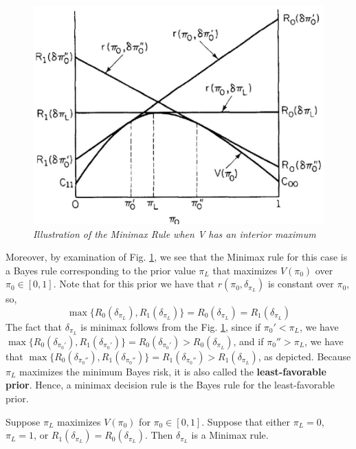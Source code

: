 \documentclass[a4paper,english,12pt]{article}
\begin{document}
\begin{figure}[h]
	\centering
	\includegraphics[width=0.7\linewidth]{Figures/minimax2}
	\caption{\textit{Illustration of the Minimax Rule when V has an interior maximum}}
	\label{fig:minimax2}
\end{figure}
\par Moreover, by examination of Fig. \ref{fig:minimax2}, we see that the Minimax rule for this case is a Bayes rule corresponding to the prior value $\pi_L$ that maximizes $V(\pi_0)$ over $\pi_0 \in [0,1]$. Note that for this prior we have that $r(\pi_0,\delta_{\pi_L})$ is constant over $\pi_0$, so,
\begin{equation}
\max\{ {R_0}({\delta _{{\pi _L}}}),{R_1}({\delta _{{\pi _L}}})\}  = {R_0}({\delta _{{\pi _L}}}) = {R_1}({\delta _{{\pi _L}}})
\end{equation}  
The fact that $\delta_{\pi_L}$ is minimax follows from the Fig. \ref{fig:minimax2}, since if $\pi_0' < \pi_L$, we have $\max\{ {R_0}({\delta _{\pi_0'}}),{R_1}({\delta _{\pi_0'}})\}  = {R_0}({\delta _{{\pi _0'}}})>{R_0}({\delta _{{\pi _L}}})$, and if $\pi_0'' > \pi_L$, we have that
$\max\{ {R_0}({\delta _{\pi_0''}}),{R_1}({\delta _{\pi_0''}})\}  = {R_1}({\delta _{{\pi _0''}}})>{R_1}({\delta _{{\pi _L}}})$, as depicted.
Because $\pi_L$ maximizes the minimum Bayes risk, it is also called the \textbf{least-favorable prior}. Hence, a minimax decision rule is the Bayes rule for the least-favorable prior.
\begin{prop}
Suppose $\pi_L$ maximizes $V(\pi_0)$ for $\pi_0 \in [0,1]$. Suppose that either $\pi_L=0$, $\pi_L=1$, or $R_1(\delta_{\pi_L})=R_0(\delta_{\pi_L})$. Then $\delta_{\pi_L}$ is a Minimax rule.
\end{prop} 
\end{document}
